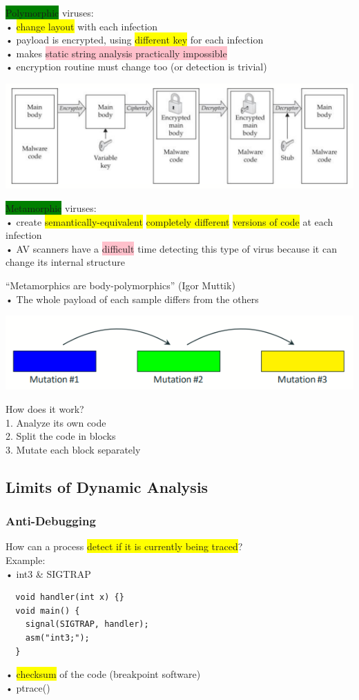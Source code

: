 \documentclass[]{project_plan}
\begin{document}
\colorbox{green}{Polymorphic} viruses:\\
• \colorbox{yellow}{change layout} with each infection\\
• payload is encrypted, using \colorbox{yellow}{different key} for each infection\\
• makes \colorbox{pink}{static string analysis practically impossible}\\
• encryption routine must change too (or detection is trivial)

\includegraphics[width=.8\linewidth]{polymorphic.png}

\colorbox{green}{Metamorphic} viruses:\\
• create \colorbox{yellow}{semantically-equivalent} \colorbox{yellow}{completely different} \colorbox{yellow}{versions of code} at each infection\\
• AV scanners have a \colorbox{pink}{difficult} time detecting this type of virus because it can change its internal structure

“Metamorphics are body-polymorphics” (Igor Muttik)\\
• The whole payload of each sample differs from the others

\includegraphics[width=.8\linewidth]{Metamorphism.png}

How does it work?\\
1. Analyze its own code\\
2. Split the code in blocks\\
3. Mutate each block separately

\subsection{Limits of Dynamic Analysis}

\subsubsection{Anti-Debugging}
How can a process \colorbox{yellow}{detect if it is currently being traced}?\\
Example:\\
• int3 \& SIGTRAP
\begin{lstlisting}
  void handler(int x) {}
  void main() {
    signal(SIGTRAP, handler);
    asm("int3;");
  }
\end{lstlisting}
• \colorbox{yellow}{checksum} of the code (breakpoint software)\\
• ptrace()
\end{document}

